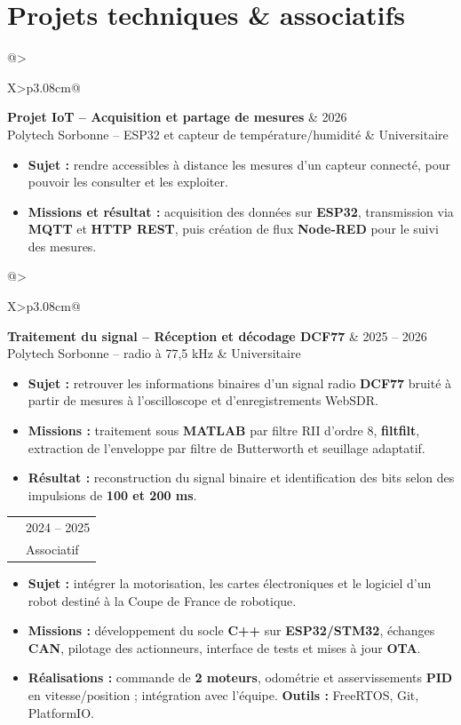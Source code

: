 \documentclass[9pt,a4paper]{extarticle}
\makeatletter
\newcommand{\entry}[4]{%
\begin{tabularx}{\linewidth}{@{}>{\raggedright\arraybackslash}X>{\raggedleft\arraybackslash}p{3.08cm}@{}}
 {\bfseries\color{bleu}#1} & {\fontsize{8.5}{9.3}\selectfont\color{secondaire}#2} \\[-2pt]
 {\fontsize{8.5}{9.6}\selectfont\color{secondaire}#3} & {\fontsize{8.5}{9.3}\selectfont\color{secondaire}#4}
\end{tabularx}\vspace{-3.4pt}\par}
\newcommand{\gapentry}{\vspace{3.0pt}}
\makeatother
\begin{document}
\section{Projets techniques \& associatifs}
\entry{Projet IoT -- Acquisition et partage de mesures}{2026}{Polytech Sorbonne -- ESP32 et capteur de température/humidité}{Universitaire}
\begin{itemize}
  \item \textbf{Sujet :} rendre accessibles à distance les mesures d'un capteur connecté, pour pouvoir les consulter et les exploiter.
  \item \textbf{Missions et résultat :} acquisition des données sur \textbf{ESP32}, transmission via \textbf{MQTT} et \textbf{HTTP REST}, puis création de flux \textbf{Node-RED} pour le suivi des mesures.
\end{itemize}
\gapentry
\entry{Traitement du signal -- Réception et décodage DCF77}{2025 -- 2026}{Polytech Sorbonne -- radio à 77,5 kHz}{Universitaire}
\begin{itemize}
  \item \textbf{Sujet :} retrouver les informations binaires d'un signal radio \textbf{DCF77} bruité à partir de mesures à l'oscilloscope et d'enregistrements WebSDR.
  \item \textbf{Missions :} traitement sous \textbf{MATLAB} par filtre RII d'ordre 8, \textbf{filtfilt}, extraction de l'enveloppe par filtre de Butterworth et seuillage adaptatif.
  \item \textbf{Résultat :} reconstruction du signal binaire et identification des bits selon des impulsions de \textbf{100 et 200 ms}.
\end{itemize}
\gapentry
\entry{Coupe de France de robotique -- Responsable électronique / asservissement}{2024 -- 2025}{Club CRAC -- robot autonome développé en équipe}{Associatif}
\begin{itemize}
  \item \textbf{Sujet :} intégrer la motorisation, les cartes électroniques et le logiciel d'un robot destiné à la Coupe de France de robotique.
  \item \textbf{Missions :} développement du socle \textbf{C++} sur \textbf{ESP32/STM32}, échanges \textbf{CAN}, pilotage des actionneurs, interface de tests et mises à jour \textbf{OTA}.
  \item \textbf{Réalisations :} commande de \textbf{2 moteurs}, odométrie et asservissements \textbf{PID} en vitesse/position ; intégration avec l'équipe. \textbf{Outils :} FreeRTOS, Git, PlatformIO.
\end{itemize}
\end{document}
